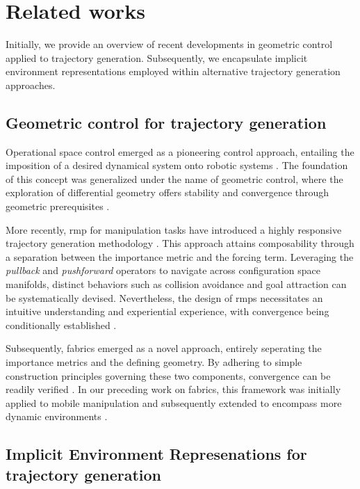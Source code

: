 \section{Related works}
\label{sec:state}

Initially, we provide an overview of recent developments in geometric control
applied to trajectory generation. Subsequently, we encapsulate implicit
environment representations employed within alternative trajectory generation
approaches.
%
\subsection{Geometric control for trajectory generation}
%
Operational space control emerged as a pioneering control approach, entailing
the imposition of a desired dynamical system onto robotic systems
\cite{Khatib1985}. The foundation of this
concept was generalized under the name of geometric control, where the
exploration of differential geometry offers stability and convergence
through geometric prerequisites \cite{bullo2019geometric}.

More recently, \ac{rmp} for manipulation tasks have
introduced a highly responsive trajectory generation methodology
\cite{Ratliff2018,Cheng2020}. This approach attains composability through a
separation between the importance metric and the forcing
term.
Leveraging the \textit{pullback} and \textit{pushforward} operators to navigate
across configuration space manifolds, distinct behaviors such as collision
avoidance and goal attraction can be systematically devised. Nevertheless, the
design of \acp{rmp} necessitates an intuitive understanding
and experiential experience,
with convergence being conditionally established \cite{Ratliff2020}.

Subsequently, \ac{fabrics} emerged as a novel approach,
entirely seperating the importance metrics and the defining
geometry. By adhering to simple construction principles
governing these two components, convergence can be readily
verified \cite{Ratliff2020,Xie2021,Li2021,meng2019neural}.
In our preceding work on \ac{fabrics}, this framework was
initially applied to mobile manipulation and subsequently
extended to encompass more dynamic environments
\cite{Spahn2023}.

\subsection{Implicit Environment Represenations for trajectory generation}

